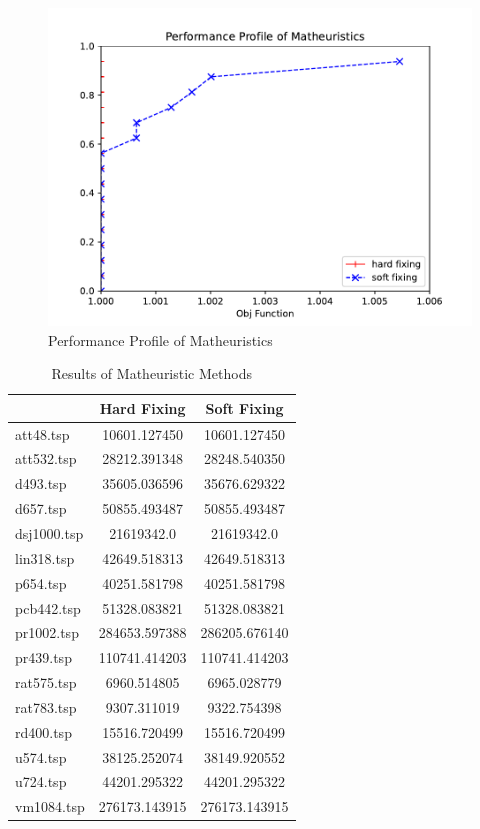 \begin{figure}[!h]
    \centering
    \includegraphics[width=\textwidth]{images/hs.pdf}
    \caption{Performance Profile of Matheuristics}
    \label{fig:hs}
\end{figure}

\begin{table}[!h]
    \centering
    \begin{tabular}{lcc}
    \cline{2-3}
                & \textbf{Hard Fixing} & \textbf{Soft Fixing} \\ \hline
    att48.tsp   & 10601.127450         & 10601.127450         \\
    att532.tsp  & 28212.391348         & 28248.540350         \\
    d493.tsp    & 35605.036596         & 35676.629322         \\
    d657.tsp    & 50855.493487         & 50855.493487         \\
    dsj1000.tsp & 21619342.0      & 21619342.0      \\
    lin318.tsp  & 42649.518313         & 42649.518313         \\
    p654.tsp    & 40251.581798         & 40251.581798         \\
    pcb442.tsp  & 51328.083821         & 51328.083821         \\
    pr1002.tsp  & 284653.597388        & 286205.676140        \\
    pr439.tsp   & 110741.414203        & 110741.414203        \\
    rat575.tsp  & 6960.514805          & 6965.028779          \\
    rat783.tsp  & 9307.311019          & 9322.754398          \\
    rd400.tsp   & 15516.720499         & 15516.720499         \\
    u574.tsp    & 38125.252074         & 38149.920552         \\
    u724.tsp    & 44201.295322         & 44201.295322         \\
    vm1084.tsp  & 276173.143915        & 276173.143915        \\ \hline
    \end{tabular}
    \caption{Results of Matheuristic Methods}
    \label{table:math}
    \end{table}